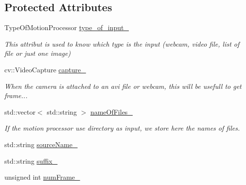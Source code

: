 \subsection*{Protected Attributes}
\begin{DoxyCompactItemize}
\item 
\hypertarget{class_opencv_sf_m_1_1_motion_processor_a9bf4bec388b8e54cd70c21ab96d44dd3}{
TypeOfMotionProcessor \hyperlink{class_opencv_sf_m_1_1_motion_processor_a9bf4bec388b8e54cd70c21ab96d44dd3}{type\_\-of\_\-input\_\-}}
\label{class_opencv_sf_m_1_1_motion_processor_a9bf4bec388b8e54cd70c21ab96d44dd3}

\begin{DoxyCompactList}\small\item\em This attribut is used to know which type is the input (webcam, video file, list of file or just one image) \end{DoxyCompactList}\item 
\hypertarget{class_opencv_sf_m_1_1_motion_processor_a90a1928ed4cc3a9dac1e6468fcd52634}{
cv::VideoCapture \hyperlink{class_opencv_sf_m_1_1_motion_processor_a90a1928ed4cc3a9dac1e6468fcd52634}{capture\_\-}}
\label{class_opencv_sf_m_1_1_motion_processor_a90a1928ed4cc3a9dac1e6468fcd52634}

\begin{DoxyCompactList}\small\item\em When the camera is attached to an avi file or webcam, this will be usefull to get frame... \end{DoxyCompactList}\item 
\hypertarget{class_opencv_sf_m_1_1_motion_processor_aa13299a7af4a16c9403a7cc68313a523}{
std::vector$<$ std::string $>$ \hyperlink{class_opencv_sf_m_1_1_motion_processor_aa13299a7af4a16c9403a7cc68313a523}{nameOfFiles\_\-}}
\label{class_opencv_sf_m_1_1_motion_processor_aa13299a7af4a16c9403a7cc68313a523}

\begin{DoxyCompactList}\small\item\em If the motion processor use directory as input, we store here the names of files. \end{DoxyCompactList}\item 
std::string \hyperlink{class_opencv_sf_m_1_1_motion_processor_a9bb3fdc8916e6d6c00a7a81408a6bbfd}{sourceName\_\-}
\item 
std::string \hyperlink{class_opencv_sf_m_1_1_motion_processor_abbf053cdaf47914a5fe9d5c918d81358}{suffix\_\-}
\item 
\hypertarget{class_opencv_sf_m_1_1_motion_processor_ab63e8294f6fdd2491b2bb06788278bfe}{
unsigned int \hyperlink{class_opencv_sf_m_1_1_motion_processor_ab63e8294f6fdd2491b2bb06788278bfe}{numFrame\_\-}}
\label{class_opencv_sf_m_1_1_motion_processor_ab63e8294f6fdd2491b2bb06788278bfe}


\end{DoxyCompactItemize}
